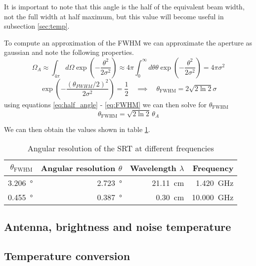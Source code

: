 It is important to note that this angle is the half of the equivalent beam width, not the full width at half maximum, but this value will become useful in subsection \ref{sec:temp}.

To compute an approximation of the FWHM we can approximate the aperture as gaussian \cite[p. 2]{script} and note the following properties.
\begin{equation}
    \Omega_A \approx \int_{4\pi } d\Omega \exp{\left( -\frac{\theta^2}{2\sigma^2} \right)} \approx 4\pi \int_0^{\infty} d\theta \theta \exp{\left( -\frac{\theta^2}{2\sigma^2} \right)} = 4\pi \sigma^2
    \label{eq:gauss_integral}
\end{equation}
\begin{equation}
    \exp{\left( -\frac{(\theta_{FWHM}/2)^2}{2\sigma^2}\right)} = \frac{1}{2} \quad \implies \quad \theta_{\text{FWHM}} = 2 \sqrt{2\ln{2}} \sigma \label{eq:FWHM}
\end{equation}
using equations \eqref{eq:half_angle} - \eqref{eq:FWHM} we can then solve for $\theta_{\text{FWHM}}$
\begin{equation}
    \theta_{\text{FWHM}} = \sqrt{2\ln{2}} \, \theta_A
\end{equation}

We can then obtain the values shown in table \ref{tab:ang_res}.
\begin{table}[h]
    \centering
    \begin{tabular}{rrrr}
        \toprule
        $\theta_{\text{FWHM}}$ & Angular resolution $\theta$ & Wavelength $\lambda$ & Frequency\\
        \midrule
        \SI{3.206}{\degree} &\SI{2.723}{\degree} & \SI{21.11}{cm} & \SI{1.420}{\giga \hertz}\\
        \SI{0.455}{\degree} &\SI{0.387}{\degree} & \SI{0.30}{cm} & \SI{10.000}{\giga \hertz}\\
        \bottomrule
    \end{tabular}
    \caption{Angular resolution of the SRT at different frequencies}
    \label{tab:ang_res}
\end{table}
\subsection{Antenna, brightness and noise temperature}

\subsection{Temperature conversion}


